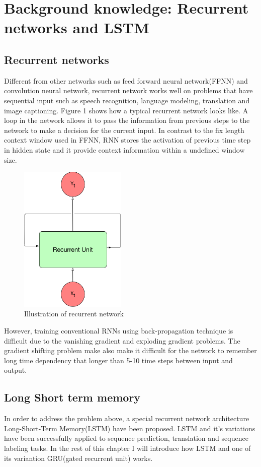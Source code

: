 \chapter{Background knowledge: Recurrent networks and LSTM}
	\label{CH_02}

\section{Recurrent networks}
Different from other networks such as feed forward neural network(FFNN) and convolution neural network, recurrent network works well on problems that have sequential input such as speech recognition, language modeling, translation and image captioning. Figure 1 shows how a typical recurrent network looks like. A loop in the network allows it to pass the information from previous steps to the network to make a decision for the current input. In contrast to the fix length context window used in FFNN, RNN stores the activation of previous time step in hidden state and it provide context information within a undefined window size.

\begin{figure}[h] 
	\centering
	\includegraphics[width=2.0in]{Figures/recurrent1}
	\caption[Box figure]{Illustration of recurrent network}
\end{figure}

However, training conventional RNNs using back-propagation technique is difficult due to the vanishing gradient and exploding gradient problems\cite{bengio1994learning}. The gradient shifting problem make
also make it difficult for the network to remember long time dependency that longer than 5-10 time steps between input and output.
\section{Long Short term memory}
In order to address the problem above, a special recurrent network architecture Long-Short-Term Memory(LSTM) have been proposed\cite{hochreiter1997long}. LSTM and it's variations have been successfully applied to sequence prediction, translation and sequence labeling tasks. In the rest of this chapter I will introduce how LSTM and one of its variantion GRU(gated recurrent unit) works.\par

